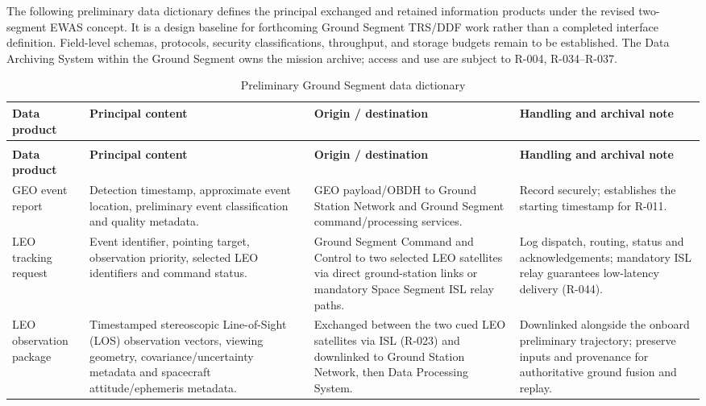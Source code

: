 The following preliminary data dictionary defines the principal exchanged and retained information products under the revised two-segment EWAS concept. It is a design baseline for forthcoming Ground Segment TRS/DDF work rather than a completed interface definition. Field-level schemas, protocols, security classifications, throughput, and storage budgets remain to be established. The Data Archiving System within the Ground Segment owns the mission archive; access and use are subject to R-004, R-034--R-037.

\begingroup
\small
\setlength{\tabcolsep}{4pt}
\renewcommand{\arraystretch}{1.16}
\begin{longtable}{@{}>{\raggedright\arraybackslash}p{}>{\raggedright\arraybackslash}p{}>{\raggedright\arraybackslash}p{}>{\raggedright\arraybackslash}p{}@{}}
\caption{Preliminary Ground Segment data dictionary}\label{tab:ewas-data-dictionary}\\
\toprule
\textbf{Data product} & \textbf{Principal content} & \textbf{Origin / destination} & \textbf{Handling and archival note} \\
\midrule
\endfirsthead
\multicolumn{4}{c}{\tablename~\thetable\ continued}\\
\toprule
\textbf{Data product} & \textbf{Principal content} & \textbf{Origin / destination} & \textbf{Handling and archival note} \\
\midrule
\endhead
\bottomrule
\endlastfoot
GEO event report & Detection timestamp, approximate event location, preliminary event classification and quality metadata. & GEO payload/OBDH to Ground Station Network and Ground Segment command/processing services. & Record securely; establishes the starting timestamp for R-011. \\
LEO tracking request & Event identifier, pointing target, observation priority, selected LEO identifiers and command status. & Ground Segment Command and Control to two selected LEO satellites via direct ground-station links or mandatory Space Segment ISL relay paths. & Log dispatch, routing, status and acknowledgements; mandatory ISL relay guarantees low-latency delivery (R-044). \\
LEO observation package & Timestamped stereoscopic Line-of-Sight (LOS) observation vectors, viewing geometry, covariance/uncertainty metadata and spacecraft attitude/ephemeris metadata. & Exchanged between the two cued LEO satellites via ISL (R-023) and downlinked to Ground Station Network, then Data Processing System. & Downlinked alongside the onboard preliminary trajectory; preserve inputs and provenance for authoritative ground fusion and replay. \\

\end{longtable}
